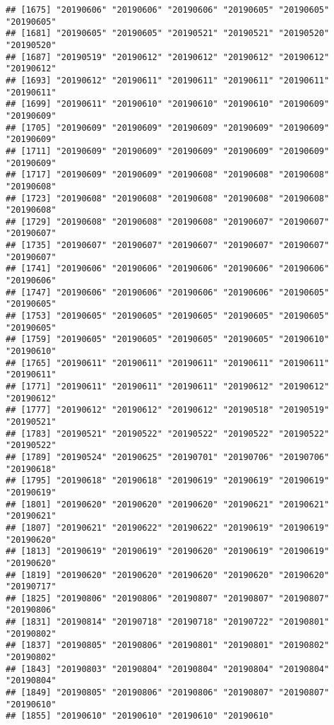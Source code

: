 \documentclass[]{article}
\newenvironment{Shaded}{\begin{snugshade}}{\end{snugshade}}
\newcommand{\DataTypeTok}[1]{\textcolor[rgb]{0.13,0.29,0.53}{#1}}
\newcommand{\KeywordTok}[1]{\textcolor[rgb]{0.13,0.29,0.53}{\textbf{#1}}}
\newcommand{\NormalTok}[1]{#1}
\newcommand{\OperatorTok}[1]{\textcolor[rgb]{0.81,0.36,0.00}{\textbf{#1}}}
\newcommand{\StringTok}[1]{\textcolor[rgb]{0.31,0.60,0.02}{#1}}
\begin{document}
\begin{verbatim}
## [1675] "20190606" "20190606" "20190606" "20190605" "20190605" "20190605"
## [1681] "20190605" "20190605" "20190521" "20190521" "20190520" "20190520"
## [1687] "20190519" "20190612" "20190612" "20190612" "20190612" "20190612"
## [1693] "20190612" "20190611" "20190611" "20190611" "20190611" "20190611"
## [1699] "20190611" "20190610" "20190610" "20190610" "20190609" "20190609"
## [1705] "20190609" "20190609" "20190609" "20190609" "20190609" "20190609"
## [1711] "20190609" "20190609" "20190609" "20190609" "20190609" "20190609"
## [1717] "20190609" "20190609" "20190608" "20190608" "20190608" "20190608"
## [1723] "20190608" "20190608" "20190608" "20190608" "20190608" "20190608"
## [1729] "20190608" "20190608" "20190608" "20190607" "20190607" "20190607"
## [1735] "20190607" "20190607" "20190607" "20190607" "20190607" "20190607"
## [1741] "20190606" "20190606" "20190606" "20190606" "20190606" "20190606"
## [1747] "20190606" "20190606" "20190606" "20190606" "20190605" "20190605"
## [1753] "20190605" "20190605" "20190605" "20190605" "20190605" "20190605"
## [1759] "20190605" "20190605" "20190605" "20190605" "20190610" "20190610"
## [1765] "20190611" "20190611" "20190611" "20190611" "20190611" "20190611"
## [1771] "20190611" "20190611" "20190611" "20190612" "20190612" "20190612"
## [1777] "20190612" "20190612" "20190612" "20190518" "20190519" "20190521"
## [1783] "20190521" "20190522" "20190522" "20190522" "20190522" "20190522"
## [1789] "20190524" "20190625" "20190701" "20190706" "20190706" "20190618"
## [1795] "20190618" "20190618" "20190619" "20190619" "20190619" "20190619"
## [1801] "20190620" "20190620" "20190620" "20190621" "20190621" "20190621"
## [1807] "20190621" "20190622" "20190622" "20190619" "20190619" "20190620"
## [1813] "20190619" "20190619" "20190620" "20190619" "20190619" "20190620"
## [1819] "20190620" "20190620" "20190620" "20190620" "20190620" "20190717"
## [1825] "20190806" "20190806" "20190807" "20190807" "20190807" "20190806"
## [1831] "20190814" "20190718" "20190718" "20190722" "20190801" "20190802"
## [1837] "20190805" "20190806" "20190801" "20190801" "20190802" "20190802"
## [1843] "20190803" "20190804" "20190804" "20190804" "20190804" "20190804"
## [1849] "20190805" "20190806" "20190806" "20190807" "20190807" "20190610"
## [1855] "20190610" "20190610" "20190610" "20190610"
\end{verbatim}

\begin{Shaded}
\end{Shaded}
\end{document}

